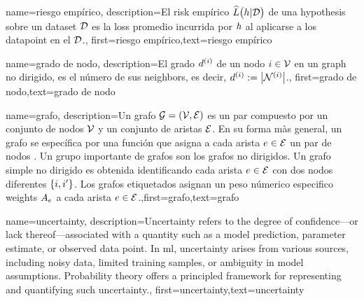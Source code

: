 {name={riesgo empírico},
 description={El \gls{risk} empírico $\widehat{L}\big(h|\mathcal{D}\big)$ 
 	de una \gls{hypothesis} sobre un \gls{dataset} $\mathcal{D}$ es la \gls{loss} promedio incurrida 
 	por $h$ al aplicarse a los \gls{datapoint} en el $\mathcal{D}$.},
 first={riesgo empírico},text={riesgo empírico} 
}

{name={grado de nodo},
	description={El grado $d^{(i)}$ de un nodo $i \in \mathcal{V}$ 
		en un \gls{graph} no dirigido, es el número de sus \gls{neighbors}, es decir, $d^{(i)} := \big|\mathcal{N}^{(i)}\big|$.},
		first={grado de nodo},text={grado de nodo} 
}


{name={grafo},
	description={Un grafo $\mathcal{G} = \left( \mathcal{V},\mathcal{E} \right)$ es un par compuesto por un  
		conjunto de nodos $\mathcal{V}$ y un conjunto de aristas $\mathcal{E}$. En su forma màs general, un grafo se 
		específica por una función que asigna a cada arista $e \in \mathcal{E}$ un par de nodos \cite{RockNetworks}. 
		Un grupo importante de grafos son los grafos no dirigidos. Un grafo simple no dirigido  
		es obtenida identificando cada arista $e \in \mathcal{E}$ con dos nodos diferentes $\{i,i'\}$. 
		Los grafos etiquetados asignan un peso númerico especifico \gls{weights} $A_{e}$ a cada 
		arista $e \in \mathcal{E}$.},first={grafo},text={grafo} 
}

{name={uncertainty},
	description={Uncertainty refers to the degree of confidence—or 
		lack thereof—associated with a quantity such as a model prediction, parameter estimate, or 
		observed data point. In \gls{ml}, uncertainty arises from various sources, including 
		noisy data, limited training samples, or ambiguity in model assumptions. Probability theory 
		offers a principled framework for representing and quantifying such uncertainty.},
	first={uncertainty},text={uncertainty}
}

